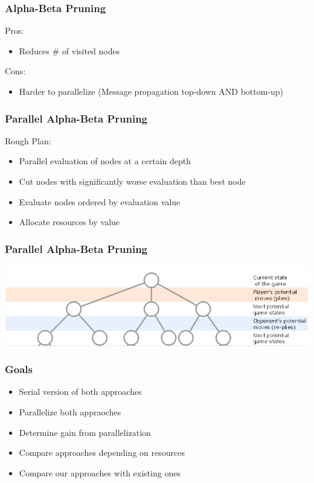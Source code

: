 \documentclass[aspectratio=43]{beamer}
\begin{document}
\begin{frame}
\frametitle{Alpha-Beta Pruning}
Pros:
\begin{itemize}
\item Reduces \# of visited nodes
\end{itemize}

Cons:
\begin{itemize}
\item Harder to parallelize (Message propagation top-down AND bottom-up)
\end{itemize}
\end{frame}

\begin{frame}
\frametitle{Parallel Alpha-Beta Pruning}
Rough Plan:
\begin{itemize}
\item Parallel evaluation of nodes at a certain depth
\item Cut nodes with significantly worse evaluation than best node
\item Evaluate nodes ordered by evaluation value
\item Allocate resources by value
\end{itemize}
\end{frame}

\begin{frame}
\frametitle{Parallel Alpha-Beta Pruning}
\includegraphics[width=\textwidth]{tree}
\end{frame}

\begin{frame}
\frametitle{Goals}

\begin{itemize}
\item Serial version of both approaches
\item Parallelize both appraoches
\item Determine gain from parallelization
\item Compare approaches depending on resources
\item Compare our approaches with existing ones
\end{itemize}
\end{frame}
\end{document}
